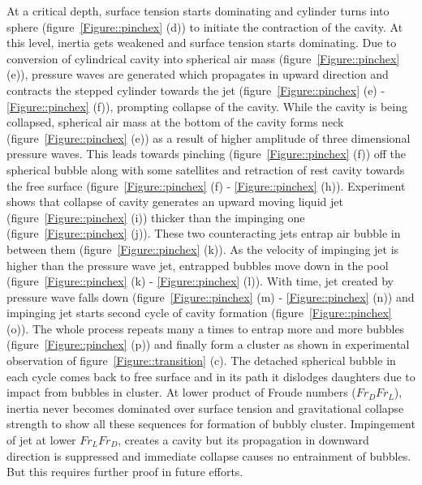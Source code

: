 At a critical depth, surface tension starts dominating and cylinder turns into sphere (figure~\ref{Figure::pinchex} (d)) to initiate the contraction of the cavity. At this level, inertia gets weakened and surface tension starts dominating. Due to conversion of cylindrical cavity into spherical air mass (figure~\ref{Figure::pinchex} (e)), pressure waves are generated which propagates in upward direction and contracts the stepped cylinder towards the jet (figure~\ref{Figure::pinchex} (e) - \ref{Figure::pinchex} (f)), prompting collapse of the cavity. While the cavity is being collapsed, spherical air mass at the bottom of the cavity forms neck (figure~\ref{Figure::pinchex} (e)) as a result of higher amplitude of three dimensional pressure waves. This leads towards pinching (figure~\ref{Figure::pinchex} (f)) off the spherical bubble along with some satellites and retraction of rest cavity towards the free surface (figure~\ref{Figure::pinchex} (f) - \ref{Figure::pinchex} (h)). Experiment shows that collapse of cavity generates an upward moving liquid jet (figure~\ref{Figure::pinchex} (i)) thicker than the impinging one (figure~\ref{Figure::pinchex} (j)). These two counteracting jets entrap air bubble in between them (figure~\ref{Figure::pinchex} (k)). As the velocity of impinging jet is higher than the pressure wave jet, entrapped bubbles move down in the pool (figure~\ref{Figure::pinchex} (k) - \ref{Figure::pinchex} (l)). With time, jet created by pressure wave falls down (figure~\ref{Figure::pinchex} (m) - \ref{Figure::pinchex} (n)) and impinging jet starts second cycle of cavity formation (figure~\ref{Figure::pinchex} (o)). The whole process repeats many a times to entrap more and more bubbles (figure~\ref{Figure::pinchex} (p)) and finally form a cluster as shown in experimental observation of figure~\ref{Figure::transition} (c). The detached spherical bubble in each cycle comes back to free surface and in its path it dislodges daughters due to impact from bubbles in cluster. At lower product of Froude numbers ($Fr_DFr_L$), inertia never becomes dominated over surface tension and gravitational collapse strength to show all these sequences for formation of bubbly cluster. Impingement of jet at lower $Fr_LFr_D$, creates a cavity but its propagation in downward direction is suppressed and immediate collapse causes no entrainment of bubbles. But this requires further proof in future efforts.\\
